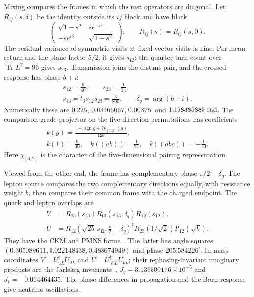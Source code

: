\documentclass[aps,prx,reprint,longbibliography]{revtex4-2}
\providecommand{\Tr}{\operatorname{Tr}}
\begin{document}
Mixing compares the frames in which the rest operators are diagonal. Let $R_{ij}(s,\delta)$ be the identity outside its $ij$ block and have block
\begin{equation}
 \begin{pmatrix}\sqrt{1-s^2}&se^{-i\delta}\\-se^{i\delta}&\sqrt{1-s^2}\end{pmatrix},
 \qquad R_{ij}(s)=R_{ij}(s,0).
 \label{eq:family_rotation}
\end{equation}
The residual variance of symmetric visits at fixed vector visits is nine. Per mean return and the plane factor $5/2$, it gives $s_{12}$; the quarter-turn count over $\Tr L^2=96$ gives $s_{23}$. Transmission joins the distant pair, and the crossed response has phase $b+i$:
\begin{equation}
\begin{gathered}
 s_{12}=\frac9{40},\qquad s_{23}=\frac1{24},\\
 s_{13}=t_0s_{12}s_{23}=\frac3{800},\qquad\delta_q=\arg(b+i).
 \end{gathered}
 \label{eq:quark_angles}
\end{equation}
Numerically these are $0.225$, $0.04166667$, $0.00375$, and $1.158385885\ {\rm rad}$. The comparison-grade projector on the five direction permutations has coefficients
\begin{equation}
 \begin{gathered}
 k(g)=\frac{1+\operatorname{sgn}g+5\chi_{[3,2]}(g)}{120},\\
 k(1)=\frac9{40},\quad k((ab))=\frac1{24},\quad k((abc))=-\frac1{40}.
 \end{gathered}
 \label{eq:mixing_idempotent}
\end{equation}
Here $\chi_{[3,2]}$ is the character of the five-dimensional pairing representation.

Viewed from the other end, the frame has complementary phase $\pi/2-\delta_q$. The lepton source compares the two complementary directions equally, with resistance weight $b$, then compares their common frame with the charged endpoint. The quark and lepton overlaps are
\begin{equation}
 \begin{split}
 V&=R_{23}(s_{23})R_{13}(s_{13},\delta_q)R_{12}(s_{12}),\\
 U&=R_{12}\!\left(\sqrt{2b}\,s_{12},\frac\pi2-\delta_q\right)^\dagger
      R_{23}(1/\sqrt2)R_{12}(\sqrt b).
 \end{split}
 \label{eq:mixing}
\end{equation}
They have the CKM and PMNS forms~\cite{Cabibbo,KM,Pontecorvo,MNS}. The latter has angle squares $(0.305089611,0.022148438,0.488674949)$ and phase $205.584226^\circ$. In mass coordinates $V=U_{uL}^\dagger U_{dL}$ and $U=U_{\ell L}^\dagger U_{\nu L}$; their rephasing-invariant imaginary products are the Jarlskog invariants~\cite{Jarlskog}, $J_q=3.135509176\times10^{-5}$ and $J_\ell=-0.014464435$. The phase differences in propagation and the Born response give neutrino oscillations.
\end{document}
